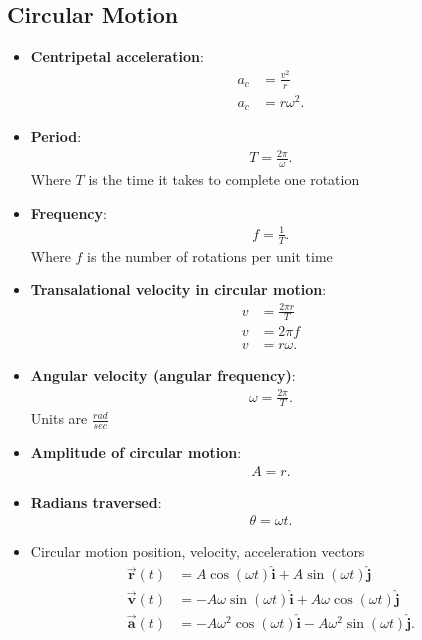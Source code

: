 \documentclass{report}
\begin{document}
    \pagebreak 
    \subsection{Circular Motion}
    \begin{itemize}
                \item \textbf{Centripetal acceleration}:
            \begin{align*}
                a_{c} &= \frac{v^{2}}{r} \\
                a_{c} &= r\omega^{2}
            .\end{align*}
        \item \textbf{Period}:
            \begin{align*}
                T = \frac{2\pi}{\omega}
            .\end{align*}
            Where $T$ is the time it takes to complete one rotation
        \item \textbf{Frequency}:
            \begin{align*}
                f = \frac{1}{T}
            .\end{align*}
            Where $f$ is the number of rotations per unit time
        \item \textbf{Transalational velocity in circular motion}:
            \begin{align*}
                v &= \frac{2\pi r}{T} \\
                v &= 2\pi f \\
                v &= r\omega
            .\end{align*}
        \item \textbf{Angular velocity (angular frequency)}:
            \begin{align*}
                \omega = \frac{2\pi}{T}
            .\end{align*}
            Units are $\frac{rad}{sec}$
        \item \textbf{Amplitude of circular motion}:
            \begin{align*}
                A = r
            .\end{align*}
        \item \textbf{Radians traversed}:
            \begin{align*}
                \theta  = \omega t
            .\end{align*}
        \item {Circular motion position, velocity, acceleration vectors}
            \begin{align*}
                \vec{\mathbf{r}}(t) &= A\cos{\left(\omega t\right)} \hat{\mathbf{i}} + A\sin{\left(\omega t\right)}\hat{\mathbf{j}} \\
                \vec{\mathbf{v}}(t) &= -A\omega\sin{\left(\omega t\right)}\hat{\mathbf{i}} + A\omega \cos{\left(\omega t\right)}\hat{\mathbf{j}} \\
                \vec{\mathbf{a}}(t) &= -A\omega^{2}\cos{\left(\omega t\right)}\hat{\mathbf{i}} - A\omega^{2}\sin{\left(\omega t\right)}\hat{\mathbf{j}}
            .\end{align*}

    \end{itemize}
\end{document}
